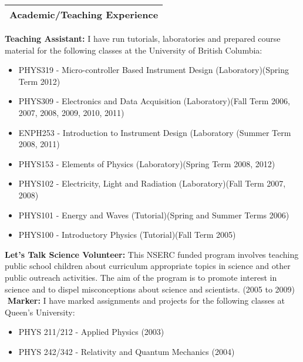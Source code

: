 \documentclass[letterpaper,12pt]{article}
\begin{document}
\noindent\Large \begin{tabular}{|p{12cm}|} \hline \textbf{Academic/Teaching Experience}\\ \hline \end{tabular} \normalsize
\linebreak
\linebreak
\textbf{Teaching Assistant:} I have run tutorials, laboratories and prepared course material for the following classes at the University of British Columbia:

\begin{itemize}
\item PHYS319 - Micro-controller Based Instrument Design (Laboratory)(Spring Term 2012)
\item PHYS309 - Electronics and Data Acquisition (Laboratory)(Fall Term 2006, 2007, 2008, 2009, 2010, 2011)
\item ENPH253 - Introduction to Instrument Design (Laboratory (Summer Term 2008, 2011)
\item PHYS153 - Elements of Physics (Laboratory)(Spring Term 2008, 2012)
\item PHYS102 - Electricity, Light and Radiation (Laboratory)(Fall Term 2007, 2008)
\item PHYS101 - Energy and Waves (Tutorial)(Spring and Summer Terms 2006)
\item PHYS100 - Introductory Physics (Tutorial)(Fall Term 2005)
\end{itemize}
\noindent \textbf{Let's Talk Science Volunteer:} This NSERC funded program involves teaching public school children about curriculum appropriate topics in science and other public outreach activities. The aim of the program is to promote interest in science and to dispel misconceptions about science and scientists. (2005 to 2009)\\
$ $\linebreak
\textbf{Marker:} I have marked assignments and projects for the following classes at Queen's University:

\begin {itemize}
\item PHYS 211/212 - Applied Physics (2003)
\item PHYS 242/342 - Relativity and Quantum Mechanics (2004)
\end {itemize} 

$ $ \linebreak
\end{document}
